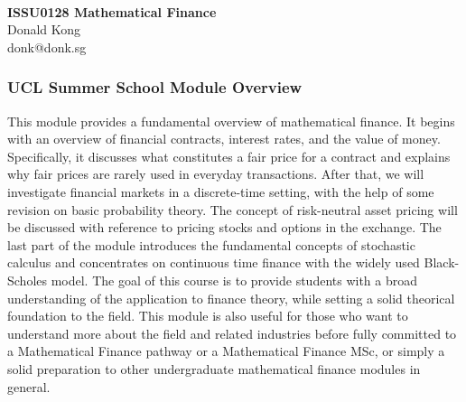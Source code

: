 \documentclass[11pt]{article}
\begin{document}
\thispagestyle{empty}
\bigskip \
\vspace{0.1cm}

\begin{center}
{\fontsize{30}{30} \selectfont \bf \sffamily ISSU0128 Mathematical Finance }\\
\vspace{24pt}
{\fontsize{14}{14} \selectfont \rmfamily Donald Kong} \\
\vspace{6pt}
{\fontsize{12}{12} \selectfont \ttfamily donk@donk.sg} \\
\vspace{24pt}
\end{center}

{\parindent0pt \baselineskip=15.5pt 
  \subsubsection{UCL Summer School Module Overview}
  This module provides a fundamental overview of mathematical finance. It
  begins with an overview of financial contracts, interest rates, and the value
  of money. Specifically, it discusses what constitutes a fair price for a
  contract and explains why fair prices are rarely used in everyday
  transactions. After that, we will investigate financial markets in a
  discrete-time setting, with the help of some revision on basic probability
  theory. The concept of risk-neutral asset pricing will be discussed with
  reference to pricing stocks and options in the exchange. The last part of the
  module introduces the fundamental concepts of stochastic calculus and
  concentrates on continuous time finance with the widely used Black-Scholes
  model. The goal of this course is to provide students with a broad
  understanding of the application to finance theory, while setting a solid
  theorical foundation to the field. This module is also useful for those who
  want to understand more about the field and related industries before fully
  committed to a Mathematical Finance pathway or a Mathematical Finance MSc, or
  simply a solid preparation to other undergraduate mathematical finance
  modules in general.
}
\end{document}
